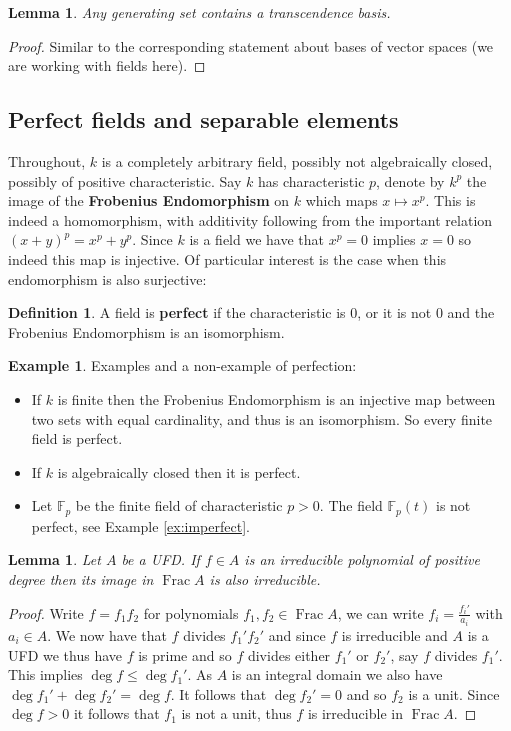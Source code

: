 \documentclass[12pt]{article}
\theoremstyle{plain}
\newtheorem{lemma}[thm]{Lemma}
\theoremstyle{definition}
\newtheorem{defn}[thm]{Definition} %
\newtheorem{example}[thm]{Example}
\newcommand{\bb}[1]{\mathbb{#1}}
\begin{document}
	\begin{lemma}
		Any generating set contains a transcendence basis.
	\end{lemma}
	\begin{proof}
		Similar to the corresponding statement about bases of vector spaces (we are working with fields here).
	\end{proof}
	\subsection{Perfect fields and separable elements}
	Throughout, $k$ is a completely arbitrary field, possibly not algebraically closed, possibly of positive characteristic.
	Say $k$ has characteristic $p$, denote by $k^p$ the image of the \textbf{Frobenius Endomorphism} on $k$ which maps $x \mapsto x^p$. This is indeed a homomorphism, with additivity following from the important relation $(x + y)^p = x^p + y^p$. Since $k$ is a field we have that $x^p = 0$ implies $x = 0$ so indeed this map is injective. Of particular interest is the case when this endomorphism is also surjective:
	\begin{defn}
		A field is \textbf{perfect} if the characteristic is $0$, or it is not $0$ and the Frobenius Endomorphism is an isomorphism.
	\end{defn}
	\begin{example}
		Examples and a non-example of perfection:
		\begin{itemize}
			\item If $k$ is finite then the Frobenius Endomorphism is an injective map between two sets with equal cardinality, and thus is an isomorphism. So every finite field is perfect.
			\item If $k$ is algebraically closed then it is perfect.
			\item Let $\bb{F}_p$ be the finite field of characteristic $p > 0$. The field $\bb{F}_p(t)$ is not perfect, see Example \ref{ex:imperfect}.
		\end{itemize}
	\end{example}
	\begin{lemma}
		\label{lem:irred_UFD}
		Let $A$ be a UFD. If $f \in A$ is an irreducible polynomial of positive degree then its image in $\operatorname{Frac}A$ is also irreducible.
	\end{lemma}
	\begin{proof}
		Write $f = f_1f_2$ for polynomials $f_1,f_2 \in \operatorname{Frac}A$, we can write $f_i = \frac{f_i'}{a_i}$ with $a_i \in A$. We now have that $f$ divides $f_1'f_2'$ and since $f$ is irreducible and $A$ is a UFD we thus have $f$ is prime and so $f$ divides either $f_1'$ or $f_2'$, say $f$ divides $f_1'$. This implies $\operatorname{deg}f \leq \operatorname{deg}f_1'$.  As $A$ is an integral domain we also have $\operatorname{deg}f_1' + \operatorname{deg}f_2' = \operatorname{deg}f$. It follows that $\operatorname{deg}f_2' = 0$ and so $f_2$ is a unit. Since $\operatorname{deg}f > 0$ it follows that $f_1$ is not a unit, thus $f$ is irreducible in $\operatorname{Frac}A$.
	\end{proof}
\end{document}
